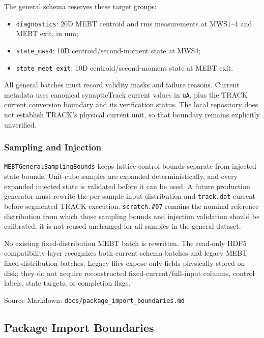\documentclass[
]{article}
\providecommand{\tightlist}{%
  \setlength{\itemsep}{0pt}\setlength{\parskip}{0pt}}
\begin{document}
The general schema reserves these target groups:

\begin{itemize}
\tightlist
\item
  \texttt{diagnostics}: 20D MEBT centroid and rms measurements at
  MWS1--4 and MEBT exit, in mm;
\item
  \texttt{state\_mws4}: 10D centroid/second-moment state at MWS4;
\item
  \texttt{state\_mebt\_exit}: 10D centroid/second-moment state at MEBT
  exit.
\end{itemize}

All general batches must record validity masks and failure reasons.
Current metadata uses canonical synapticTrack current values in
\texttt{uA}, plus the TRACK current conversion boundary and its
verification status. The local repository does not establish TRACK's
physical current unit, so that boundary remains explicitly unverified.

\hypertarget{sampling-and-injection}{%
\subsubsection{Sampling and Injection}\label{sampling-and-injection}}

\texttt{MEBTGeneralSamplingBounds} keeps lattice-control bounds separate
from injected-state bounds. Unit-cube samples are expanded
deterministically, and every expanded injected state is validated before
it can be used. A future production generator must rewrite the
per-sample input distribution and \texttt{track.dat} current before
segmented TRACK execution. \texttt{scratch.\#07} remains the nominal
reference distribution from which those sampling bounds and injection
validation should be calibrated; it is not reused unchanged for all
samples in the general dataset.

No existing fixed-distribution MEBT batch is rewritten. The read-only
HDF5 compatibility layer recognizes both current schema batches and
legacy MEBT fixed-distribution batches. Legacy files expose only fields
physically stored on disk; they do not acquire reconstructed
fixed-current/full-input columns, control labels, state targets, or
completion flags.

Source Markdown: \texttt{docs/package\_import\_boundaries.md}

\hypertarget{package-import-boundaries}{%
\subsection{Package Import Boundaries}\label{package-import-boundaries}}
\end{document}
